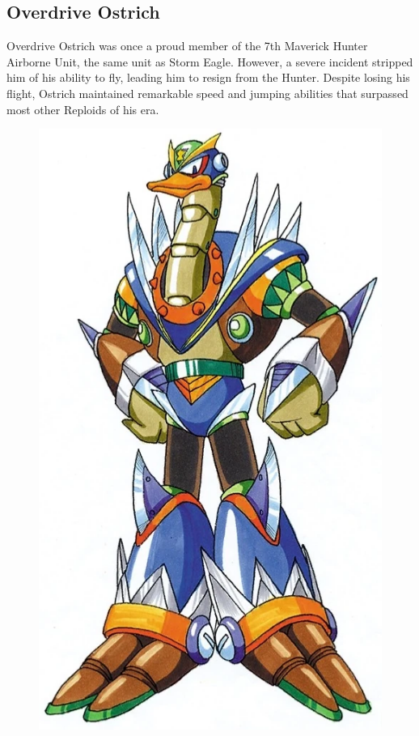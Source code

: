 \subsection{Overdrive Ostrich}\label{boss:Overdrive_ostrich}

Overdrive Ostrich was once a proud member of the 7th Maverick Hunter Airborne Unit, the same unit as Storm Eagle. However, a severe incident stripped him of his ability to fly, leading him to resign from the Hunter. Despite losing his flight, Ostrich maintained remarkable speed and jumping abilities that surpassed most other Reploids of his era.\begin{figure}[htp]
	\centering
	\includegraphics[height=\portraitsize]{figures/X2/Overdrive_ostrich/Overdrive_Ostrich.png}

\end{figure}
